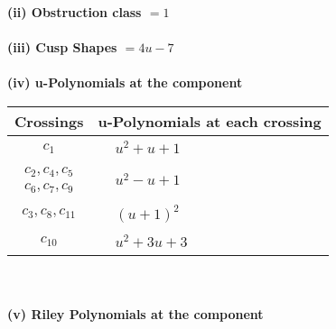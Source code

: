 \documentclass[1p]{elsarticle_modified}
\theoremstyle{definition}
\begin{document}
\flushleft \textbf{(ii) Obstruction class $= 1$}\\~\\
\flushleft \textbf{(iii) Cusp Shapes $= 4 u-7$}\\~\\
\newpage\renewcommand{\arraystretch}{1}
\flushleft \textbf{(iv) u-Polynomials at the component}\newline \\
\begin{tabular}{m{50pt}|m{274pt}}
Crossings & \hspace{64pt}u-Polynomials at each crossing \\
\hline $$\begin{aligned}c_{1}\end{aligned}$$&$\begin{aligned}
&u^2+u+1
\end{aligned}$\\
\hline $$\begin{aligned}c_{2},c_{4},c_{5}\\c_{6},c_{7},c_{9}\end{aligned}$$&$\begin{aligned}
&u^2- u+1
\end{aligned}$\\
\hline $$\begin{aligned}c_{3},c_{8},c_{11}\end{aligned}$$&$\begin{aligned}
&(u+1)^2
\end{aligned}$\\
\hline $$\begin{aligned}c_{10}\end{aligned}$$&$\begin{aligned}
&u^2+3 u+3
\end{aligned}$\\
\hline
\end{tabular}\\~\\
\newpage\renewcommand{\arraystretch}{1}
\flushleft \textbf{(v) Riley Polynomials at the component}\newline \\
\end{document}
